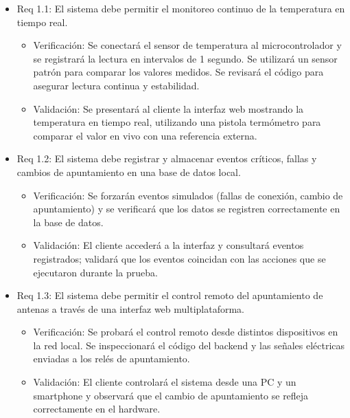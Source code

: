 \documentclass[
11pt, %
]{charter}
\begin{document}
\begin{itemize} 

\item Req 1.1: El sistema debe permitir el monitoreo continuo de la temperatura en tiempo real.

\begin{itemize}
	\item Verificación: Se conectará el sensor de temperatura al microcontrolador y se registrará la lectura en intervalos de 1 segundo. Se utilizará un sensor patrón para comparar los valores medidos. Se revisará el código para asegurar lectura continua y estabilidad.
	\item 	Validación: Se presentará al cliente la interfaz web mostrando la temperatura en tiempo real, utilizando una pistola termómetro para comparar el valor en vivo con una referencia externa.
\end{itemize}

\item Req 1.2: El sistema debe registrar y almacenar eventos críticos, fallas y cambios de apuntamiento en una base de datos local.

\begin{itemize}
	\item Verificación: Se forzarán eventos simulados (fallas de conexión, cambio de apuntamiento) y se verificará que los datos se registren correctamente en la base de datos.

	\item Validación: El cliente accederá a la interfaz y consultará eventos registrados; validará que los eventos coincidan con las acciones que se ejecutaron durante la prueba.

\end{itemize}

\item Req 1.3: El sistema debe permitir el control remoto del apuntamiento de antenas a través de una interfaz web multiplataforma.

\begin{itemize}
	\item Verificación: Se probará el control remoto desde distintos dispositivos en la red local. Se inspeccionará el código del backend y las señales eléctricas enviadas a los relés de apuntamiento.

	\item Validación: El cliente controlará el sistema desde una PC y un smartphone y observará que el cambio de apuntamiento se refleja correctamente en el hardware.
\end{itemize}


\end{itemize}
\end{document}
